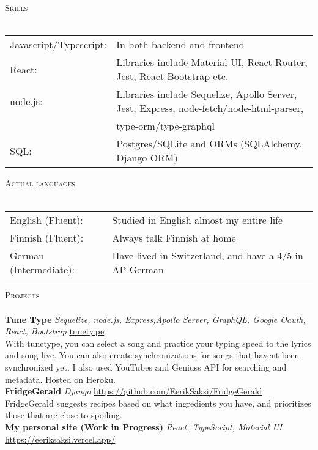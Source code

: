 \documentclass[a4paper]{article}
\newcommand{\lineunder} {
    \vspace*{-8pt} \\
    \hspace*{-18pt} \hrulefill \\
}
\newcommand{\header} [1] {
    {\hspace*{-18pt}\vspace*{6pt} \textsc{#1}}
    \vspace*{-6pt} \lineunder
}
\begin{document}
\header{Skills}
\begin{tabular}{ l l }
	Javascript/Typescript: & In both backend and frontend                                                           \\
	React:                 & Libraries include Material UI, React Router, Jest, React Bootstrap etc.                \\
	node.js:               & Libraries include Sequelize, Apollo Server, Jest, Express, node-fetch/node-html-parser,   \\ 
  & type-orm/type-graphql \\
	SQL:                   & Postgres/SQLite and ORM\textquotesingle{}s (SQLAlchemy, Django ORM)         \\
\end{tabular}
\vspace{2mm}

\header{Actual languages}
\begin{tabular}{ l l }
  English (Fluent): & Studied in English almost my entire life \\
  Finnish (Fluent): & Always talk Finnish at home                \\
  German (Intermediate): & Have lived in Switzerland, and have a 4/5 in AP German \\
\end{tabular}
\vspace{2mm}

\header{Projects}
    {\textbf{Tune Type}} {\sl Sequelize, node.js, Express,Apollo Server, GraphQL, Google Oauth, React, Bootstrap} \hfill \url{tunety.pe}\\
With tunetype, you can select a song and practice your typing speed to the lyrics and song live. You can also create synchronizations for songs that haven\textquotesingle{}t been synchronized yet. I also used YouTube\textquotesingle{}s and Genius\textquotesingle{}s API for searching and metadata. Hosted on Heroku.\\
\vspace*{2mm}
    {\textbf{FridgeGerald}} {\sl Django} \hfill \url{https://github.com/EerikSaksi/FridgeGerald}\\
FridgeGerald suggests recipes based on what ingredients you have, and prioritizes those that are close to spoiling.\\
\vspace*{2mm}
    {\textbf{My personal site (Work in Progress)}} {\sl React, TypeScript, Material UI} \hfill \url{https://eeriksaksi.vercel.app/}\\

\vspace*{2mm}

\ 
\end{document}
